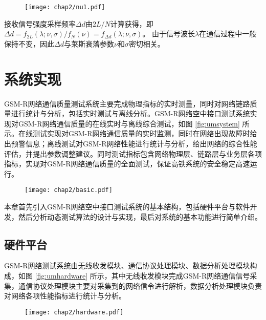 \begin{figure}[!htp]
\centerline{
\texttt{[image: chap2/nu1.pdf]}
}
\end{figure}

接收信号强度采样频率$\Delta d$由$2L/N$计算获得，即$\Delta d=f_{2L}(\lambda;\nu,\sigma)/f_{N}(\nu)=f_{\Delta d}(\lambda;\nu,\sigma)$。 由于信号波长$\lambda$在通信过程中一般保持不变，因此$\Delta d$与莱斯衰落参数$\nu$和$\sigma$密切相关。

\section{系统实现}
\label{sec:system_phy}

GSM-R网络通信质量测试系统主要完成物理指标的实时测量，同时对网络链路质量进行统计与分析，包括实时测试与离线分析。GSM-R网络空中接口测试系统实现对GSM-R网络通信质量的在线实时与离线综合测试，如图 \ref{fig:umsystem} 所示。在线测试实现对GSM-R网络通信质量的实时监测，同时在网络出现故障时给出预警信息；离线测试对GSM-R网络性能进行统计与分析，给出网络的综合性能评估，并提出参数调整建议。同时测试指标包含网络物理层、链路层与业务层各项指标，实现对GSM-R网络通信质量的全面测试，保证高铁系统的安全稳定高速运行。

\begin{figure}[!htp]
\centering
    \texttt{[image: chap2/basic.pdf]}
\end{figure}

本章首先引入GSM-R网络空中接口测试系统的基本结构，包括硬件平台与软件开发，然后分析动态测试算法的设计与实现，最后对系统的基本功能进行简单介绍。

\subsection{硬件平台}
\label{sec:um}

GSM-R网络测试系统由无线收发模块、通信协议处理模块、数据分析处理模块构成，如图 \ref{fig:umhardware} 所示，其中无线收发模块完成GSM-R网络通信信号采集，通信协议处理模块主要对采集到的网络信令进行解析，数据分析处理模块负责对网络各项性能指标进行统计与分析。

\begin{figure}[!htp]
\centering
    \texttt{[image: chap2/hardware.pdf]}
\end{figure}

